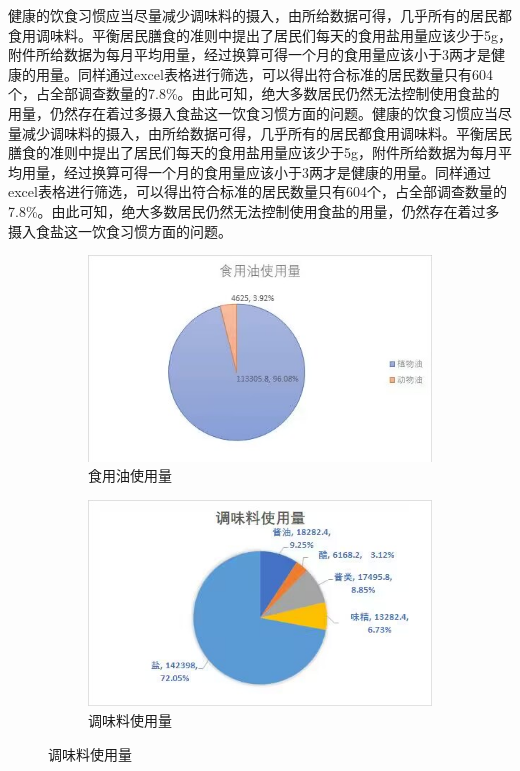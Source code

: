 \documentclass{cumcmthesis}
\begin{document}
 健康的饮食习惯应当尽量减少调味料的摄入，由所给数据可得，几乎所有的居民都食用调味料。平衡居民膳食的准则中提出了居民们每天的食用盐用量应该少于5g，附件所给数据为每月平均用量，经过换算可得一个月的食用量应该小于3两才是健康的用量。同样通过excel表格进行筛选，可以得出符合标准的居民数量只有604个，占全部调查数量的7.8\%。由此可知，绝大多数居民仍然无法控制使用食盐的用量，仍然存在着过多摄入食盐这一饮食习惯方面的问题。健康的饮食习惯应当尽量减少调味料的摄入，由所给数据可得，几乎所有的居民都食用调味料。平衡居民膳食的准则中提出了居民们每天的食用盐用量应该少于5g，附件所给数据为每月平均用量，经过换算可得一个月的食用量应该小于3两才是健康的用量。同样通过excel表格进行筛选，可以得出符合标准的居民数量只有604个，占全部调查数量的7.8\%。由此可知，绝大多数居民仍然无法控制使用食盐的用量，仍然存在着过多摄入食盐这一饮食习惯方面的问题。
\begin{figure}[H]
  \centering

  \begin{subfigure}[b]{0.45\textwidth}
    \includegraphics[width=\textwidth]{figures/QQ图片20230813170116.jpg}
    \caption{食用油使用量}
    \label{t11}
  \end{subfigure}
  \hfill
  \begin{subfigure}[b]{0.45\textwidth}
    \includegraphics[width=\textwidth]{figures/QQ图片20230813170545.jpg}
    \caption{调味料使用量}
    \label{t12}
  \end{subfigure}
\end{figure}
\end{document}
